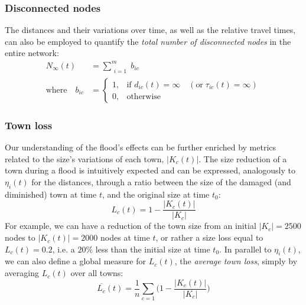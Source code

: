 \documentclass[twocolumn,fleqn,10pt]{wlscirep}
\begin{document}
\subsubsection*{Disconnected nodes}




The distances and their variations over time, as well as the relative travel times, can also be employed to quantify the \emph{total number of disconnected nodes} in the entire network:
\begin{align}
N_\infty(t) &= \sum\limits_{\substack{i=1}}^{m} b_{ic} 
\label{infinitedistances}
    \\
    \text{where} \quad b_{ic} &= \nonumber
\begin{cases}
    1,& \text{if } d_{i c} (t) = \infty \quad (\text{or} \; \tau_{i c} (t) = \infty)\\
    0,              & \text{otherwise}
\end{cases}
\end{align}





\subsubsection*{Town loss}





Our understanding of the flood’s effects can be further enriched by metrics related to the size’s variations of each town, $|K_c(t)|$. The size reduction of a town during a flood is intuitively expected and can be expressed, analogously to $\eta_i(t)$ for the distances, through a ratio between the size of the damaged (and diminished) town at time $t$, and the original size at time $t_0$:
\begin{equation}
L_c(t) = 1 - \frac{|K_c(t)|}{|K_c|} 
\label{loss}
\end{equation}
For example, we can have a reduction of the town size from an initial $|K_c|=2500$ nodes to $|K_c(t)|=2000$ nodes at time $t$, or rather a size loss equal to $L_c(t)=0.2$, i.e. a $20\%$ less than the initial size at time $t_0$. In parallel to $\eta_i(t)$, we can also define a global measure for $L_c(t)$, the \emph{average town loss}, simply by averaging $L_c(t)$ over all towns:
\begin{equation}
\overline{L_c}(t) = \frac{1}{n}\sum_{c=1} \bigg(
1-\frac{|K_c(t)|}{|K_c|} \bigg) 
\label{averageloss}
\end{equation}
\end{document}
